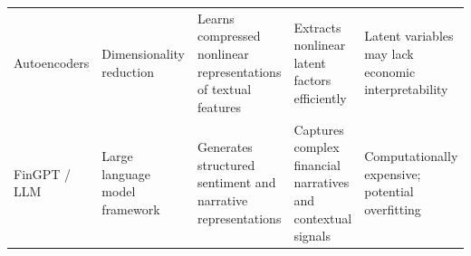 \documentclass[journal]{IEEEtran}
\begin{document}
\begin{table}[H]
\begin{tabular}{p{2.2cm} p{2.4cm} p{4.6cm} p{3.1cm} p{3.1cm}}
Autoencoders & Dimensionality reduction & Learns compressed nonlinear representations of textual features \cite{Hinton2006Autoencoder} & Extracts nonlinear latent factors efficiently & Latent variables may lack economic interpretability \\

FinGPT / LLM & Large language model framework & Generates structured sentiment and narrative representations \cite{Yang2023FinGPT} & Captures complex financial narratives and contextual signals & Computationally expensive; potential overfitting \\

\bottomrule
\end{tabular}
\end{table}

\clearpage
\twocolumn
\end{document}
